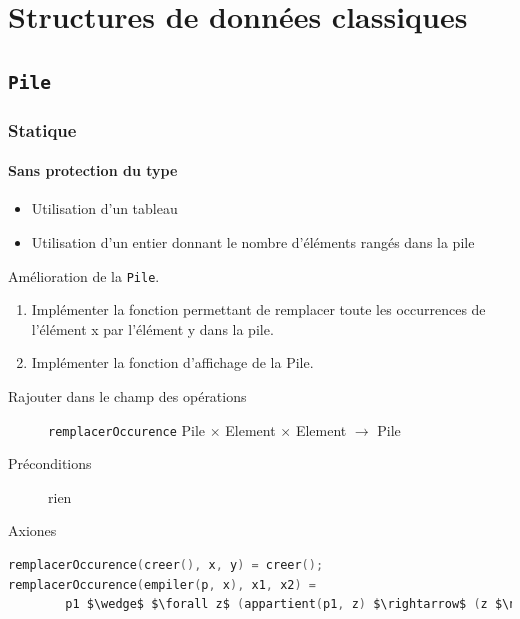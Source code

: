 \chapter{Structures de données classiques}
\minitoc
\section{\texttt{Pile}}

	\subsection{Statique}
	\subsubsection{Sans protection du type}
\begin{itemize}
	\item Utilisation d'un tableau
	\item Utilisation d'un entier donnant le nombre d'éléments rangés dans la pile
\end{itemize}


Amélioration de la \texttt{Pile}.
\begin{enumerate}
	\item Implémenter la fonction permettant de remplacer toute les occurrences de l'élément x par l'élément y dans la pile.
	\item Implémenter la fonction d'affichage de la Pile.
\end{enumerate}
\begin{description}
	\item[Rajouter dans le champ des opérations] \texttt{remplacerOccurence} Pile $\times$ Element $\times$ Element $\rightarrow$ Pile
	\item[Préconditions] rien
	\item[Axiones]
\end{description}

\begin{lstlisting}[language=C]
remplacerOccurence(creer(), x, y) = creer();
remplacerOccurence(empiler(p, x), x1, x2) = 
		p1 $\wedge$ $\forall z$ (appartient(p1, z) $\rightarrow$ (z $\neq$ x1) (empiler(p, x), z') $\wedge$ z' = x1))
\end{lstlisting}

